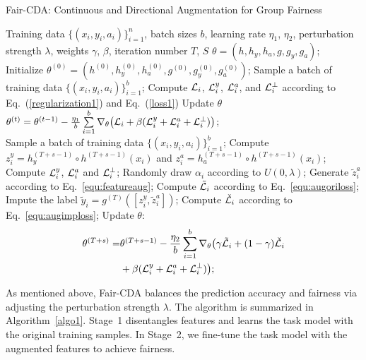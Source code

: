 \documentclass[letterpaper]{article} %
\begin{document}
\begin{algorithm}[t]\small
\caption{Fair-CDA: Continuous and Directional Augmentation for Group Fairness}
\label{algo1}
\begin{algorithmic}[1]
\REQUIRE Training data $\{(x_i,y_i,a_i)\}_{i=1}^n$, batch sizes $b$, learning rate $\eta_1$, $\eta_2$, perturbation strength $\lambda$, weights $\gamma$, $\beta$, iteration number $T$, $S$
\ENSURE $\theta =(h,h_y,h_a, g, g_y, g_a)$;\\
\STATE Initialize $\theta^{(0)} =(h^{(0)},h_y^{(0)},h_a^{(0)}, g^{(0)}, g_y^{(0)}, g_a^{(0)})$;
\STATE Sample a batch of training data $\{(x_i,y_i,a_i)\}_{i=1}^b$;
\STATE Compute $\mathcal L_i$, $\mathcal L_i^y$, $\mathcal L_i^a$, and $\mathcal L_i^{\perp}$ according to Eq.~(\ref{regularization1}) and Eq.~(\ref{loss1})
\STATE Update $\theta$\\
$\theta^{(t)} = \theta^{(t-1)} -  \frac{\eta_1}{b} \sum\limits_{i=1}^{b} \nabla_\theta \big(\mathcal L_i + \beta( \mathcal L_i^y + \mathcal L_i^a +  \mathcal L_i^{\perp})\big)$;
\ENDFOR\\
		\STATE Sample a batch of training data $\{(x_i,y_i,a_i)\}_{i=1}^b$;
		\STATE Compute $z_i^y = h_y^{(T+s-1)}\circ h^{(T+s-1)}(x_i)$ and $z_i^a = h_a^{(T+s-1)}\circ h^{(T+s-1)}(x_i)$;
		\STATE Compute $\mathcal L_i^y$, $\mathcal L_i^a$ and $\mathcal L_i^{\perp}$;
		\STATE Randomly draw $\alpha_i$ according to $U(0,\lambda)$;
		\STATE Generate $\tilde{z}^a_i$ according to Eq.~\eqref{equ:featureaug};
		\STATE Compute $\tilde{\mathcal L}_i$ according to Eq.~\eqref{equ:augoriloss};
		\STATE Impute the label $\tilde{y}_i =g^{(T)}([z^y_i, \tilde{z}^a_i])$;
		\STATE Compute $\check{\mathcal L}_i$ according to Eq.~\eqref{equ:augimploss};
		\ENDFOR
		\STATE Update $\theta$: 
        \begin{equation*}
        \begin{split}
            \theta^{(T+s)} =& \theta^{(T+s-1)} - \frac{\eta_2}{b} \sum\limits_{i=1}^{b} \nabla_\theta \big(\gamma \tilde{\mathcal L}_i + (1-\gamma) \check{\mathcal L}_i \\
            & + \beta ( \mathcal L_i^y +  \mathcal L_i^a + \mathcal L_i^{\perp}) \big);
        \end{split}
        \end{equation*}       
		\ENDFOR
	\end{algorithmic}
\end{algorithm}


 As mentioned above, Fair-CDA balances the prediction accuracy and fairness via adjusting the perturbation strength $\lambda$. 
The algorithm is summarized in Algorithm~\ref{algo1}.
Stage~1 disentangles features and learns the task model with the original training samples. In Stage~2, we fine-tune the task model with the augmented features to achieve fairness.
\end{document}
